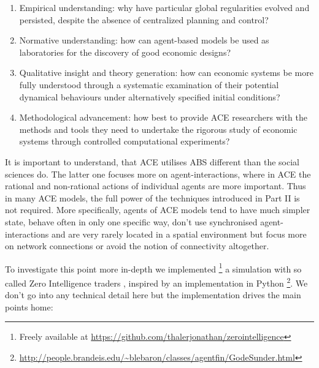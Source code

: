 \begin{enumerate}
	\item Empirical understanding: why have particular global regularities evolved and persisted, despite the absence of centralized planning and control?
	\item Normative understanding: how can agent-based models be used as laboratories for the discovery of good economic designs?
	\item Qualitative insight and theory generation: how can economic systems be more fully understood through a systematic examination of their potential dynamical behaviours under alternatively specified initial conditions?
	\item Methodological advancement: how best to provide ACE researchers with the methods and tools they need to undertake the rigorous study of economic systems through controlled computational experiments?
\end{enumerate}

It is important to understand, that ACE utilises ABS different than the social sciences do. The latter one focuses more on agent-interactions, where in ACE the rational and non-rational actions of individual agents are more important. Thus in many ACE models, the full power of the techniques introduced in Part II is not required. More specifically, agents of ACE models tend to have much simpler state, behave often in only one specific way, don't use synchronised agent-interactions and are very rarely located in a spatial environment but focus more on network connections \cite{wilhite_economic_2006, glasserman_contagion_2015} or avoid the notion of connectivity altogether.

\medskip

To investigate this point more in-depth we implemented \footnote{Freely available at \url{https://github.com/thalerjonathan/zerointelligence}} a simulation with so called Zero Intelligence traders \cite{gode_allocative_1993}, inspired by an implementation in Python \footnote{\url{http://people.brandeis.edu/~blebaron/classes/agentfin/GodeSunder.html}}. We don't go into any technical detail here but the implementation drives the main points home:


